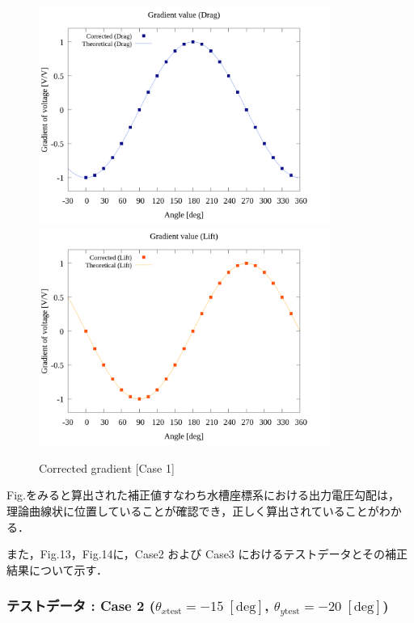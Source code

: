 \begin{figure}[htbp]
  \begin{center}
    \includegraphics[width=95mm]{../../02_workspace/result/rotation_tx=15.0_ty=20.0/plot/21/21-4_corrected_angle_drag.png}
    \includegraphics[width=95mm]{../../02_workspace/result/rotation_tx=15.0_ty=20.0/plot/21/21-4_corrected_angle_lift.png}
  \end{center}
  \caption{Corrected gradient [Case 1]}
\end{figure}

Fig.をみると算出された補正値すなわち水槽座標系における出力電圧勾配は，
理論曲線状に位置していることが確認でき，正しく算出されていることがわかる．

\newpage
また，Fig.13，Fig.14に，Case2 および Case3 におけるテストデータとその補正結果について示す．

\subsubsection{テストデータ : Case 2 ($\theta_{x \mathrm{test}} = -15 \; \mathrm{[deg]}$, $\theta_{y \mathrm{test}} = -20 \; \mathrm{[deg]}$)}


